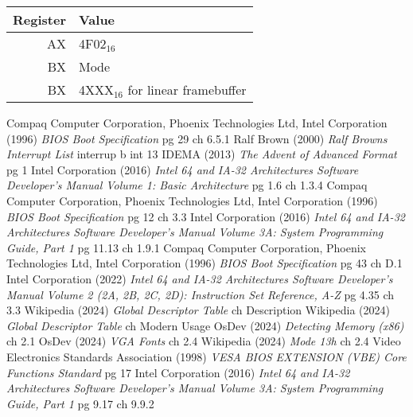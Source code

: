 \documentclass{article}
\begin{document}
\begin{tabular}{|r|l|}
	\hline
	\textbf{Register} & \textbf{Value} \\
	\hline
	AX & 4F02$_{16}$ \\
	\hline
	BX & Mode \\
	\hline
	BX & 4XXX$_{16}$ for linear framebuffer \\
	\hline
\end{tabular}

\newpage

\begin{thebibliography}{99}
		Compaq Computer Corporation, Phoenix Technologies Ltd, Intel Corporation (1996)
		\emph{BIOS Boot Specification}
		pg 29 ch 6.5.1
		Ralf Brown (2000)
		\emph{Ralf Browns Interrupt List}
		interrup b int 13
		IDEMA (2013)
		\emph{The Advent of Advanced Format}
		pg 1
		Intel Corporation (2016)
		\emph{Intel 64 and IA-32 Architectures Software Developer’s Manual Volume 1: Basic Architecture}
		pg 1.6 ch 1.3.4
		Compaq Computer Corporation, Phoenix Technologies Ltd, Intel Corporation (1996)
		\emph{BIOS Boot Specification}
		pg 12 ch 3.3
		Intel Corporation (2016)
		\emph{Intel 64 and IA-32 Architectures Software Developer’s Manual Volume 3A: System Programming Guide, Part 1}
		pg 11.13 ch 1.9.1
		Compaq Computer Corporation, Phoenix Technologies Ltd, Intel Corporation (1996)
		\emph{BIOS Boot Specification}
		pg 43 ch D.1
		Intel Corporation (2022)
		\emph{Intel 64 and IA-32 Architectures Software Developer’s Manual Volume 2 (2A, 2B, 2C, 2D): Instruction Set Reference, A-Z}
		pg 4.35 ch 3.3
		Wikipedia (2024)
		\emph{Global Descriptor Table}
		ch Description
		Wikipedia (2024)
		\emph{Global Descriptor Table}
		ch Modern Usage
		OsDev (2024)
		\emph{Detecting Memory (x86)}
		ch 2.1
		OsDev (2024)
		\emph{VGA Fonts}
		ch 2.4
		Wikipedia (2024)
		\emph{Mode 13h}
		ch 2.4
		Video Electronics Standards Association (1998)
		\emph{VESA BIOS EXTENSION (VBE) Core Functions Standard}
		pg 17
		Intel Corporation (2016)
		\emph{Intel 64 and IA-32 Architectures Software Developer’s Manual Volume 3A: System Programming Guide, Part 1}
		pg 9.17 ch 9.9.2
\end{thebibliography}
\end{document}
